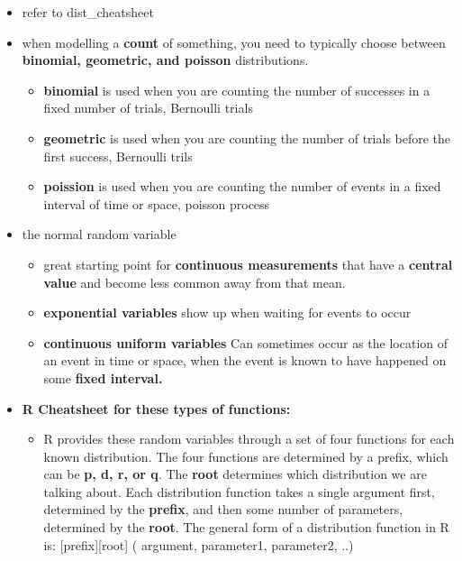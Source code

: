 \documentclass[
]{article}
\providecommand{\tightlist}{%
  \setlength{\itemsep}{0pt}\setlength{\parskip}{0pt}}
\begin{document}
\begin{itemize}
\tightlist
\item
  refer to dist\_cheatsheet
\item
  when modelling a \textbf{count} of something, you need to typically
  choose between \textbf{binomial, geometric, and poisson}
  distributions.

  \begin{itemize}
  \tightlist
  \item
    \textbf{binomial} is used when you are counting the number of
    successes in a fixed number of trials, Bernoulli trials
  \item
    \textbf{geometric} is used when you are counting the number of
    trials before the first success, Bernoulli trils
  \item
    \textbf{poission} is used when you are counting the number of events
    in a fixed interval of time or space, poisson process
  \end{itemize}
\item
  the normal random variable

  \begin{itemize}
  \tightlist
  \item
    great starting point for \textbf{continuous measurements} that have
    a \textbf{central value} and become less common away from that mean.
  \item
    \textbf{exponential variables} show up when waiting for events to
    occur
  \item
    \textbf{continuous uniform variables} Can sometimes occur as the
    location of an event in time or space, when the event is known to
    have happened on some \textbf{fixed interval.}
  \end{itemize}
\item
  \textbf{R Cheatsheet for these types of functions:}

  \begin{itemize}
  \tightlist
  \item
    R provides these random variables through a set of four functions
    for each known distribution. The four functions are determined by a
    prefix, which can be \textbf{p, d, r, or q}. The \textbf{root}
    determines which distribution we are talking about. Each
    distribution function takes a single argument first, determined by
    the \textbf{prefix}, and then some number of parameters, determined
    by the \textbf{root}. The general form of a distribution function in
    R is: {[}prefix{]}{[}root{]} ( argument, parameter1, parameter2, ..)


\end{itemize}
\end{itemize}
\end{document}
